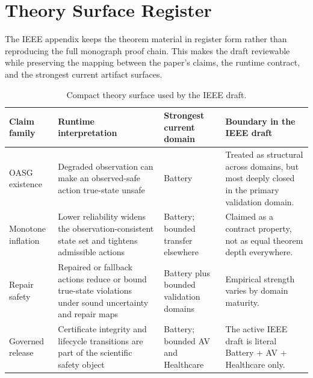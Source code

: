 \section{Theory Surface Register}
\label{sec:ieee-app-theory}

The IEEE appendix keeps the theorem material in register form rather than reproducing
the full monograph proof chain. This makes the draft reviewable while preserving the
mapping between the paper's claims, the runtime contract, and the strongest current
artifact surfaces.

\begin{table}[h]
\centering
\caption{Compact theory surface used by the IEEE draft.}
\label{tab:ieee-appendix-theory}
\small
\begin{tabularx}{\textwidth}{@{}p{}p{}p{}p{}@{}}
\toprule
\textbf{Claim family} & \textbf{Runtime interpretation} & \textbf{Strongest current domain} & \textbf{Boundary in the IEEE draft}\\
\midrule
OASG existence & Degraded observation can make an observed-safe action true-state unsafe & Battery & Treated as structural across domains, but most deeply closed in the primary validation domain.\\
Monotone inflation & Lower reliability widens the observation-consistent state set and tightens admissible actions & Battery; bounded transfer elsewhere & Claimed as a contract property, not as equal theorem depth everywhere.\\
Repair safety & Repaired or fallback actions reduce or bound true-state violations under sound uncertainty and repair maps & Battery plus bounded validation domains & Empirical strength varies by domain maturity.\\
Governed release & Certificate integrity and lifecycle transitions are part of the scientific safety object & Battery; bounded AV and Healthcare & The active IEEE draft is literal Battery + AV + Healthcare only.\\
\bottomrule
\end{tabularx}
\end{table}
